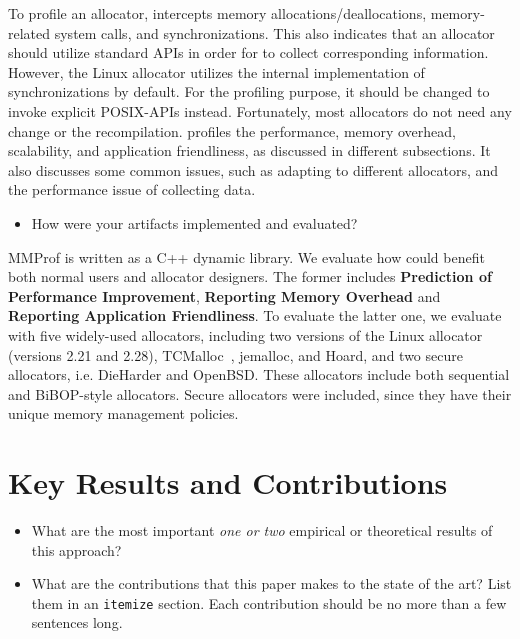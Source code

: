 \documentclass[pageno]{jpaper}
\begin{document}
\noindent
To profile an allocator, \MP{} intercepts memory allocations/deallocations, memory-related system calls, and synchronizations. This also indicates that an allocator should utilize standard APIs in order for \MP{} to collect corresponding information. However, the Linux allocator utilizes the internal implementation of synchronizations by default. For the profiling purpose, it should be changed to invoke explicit POSIX-APIs instead. Fortunately, most allocators do not need any change or the recompilation.  \MP{} profiles the performance, memory overhead, scalability, and application friendliness, as discussed in different subsections. It also discusses some common issues, such as adapting to different allocators, and the performance issue of collecting data. 

\begin{itemize}
  \item How were your artifacts implemented and evaluated? 
\end{itemize}

\noindent
MMProf is written as a C++ dynamic library. 
We evaluate how \MP{} could benefit both normal users and allocator designers. 
The former includes \textbf{Prediction of Performance Improvement}, \textbf{Reporting Memory Overhead} and \textbf{Reporting Application Friendliness}. 
To evaluate the latter one, we evaluate \MP{} with five widely-used allocators, including two versions of the Linux allocator (versions 2.21 and 2.28), TCMalloc~\cite{tcmalloc}, jemalloc, and Hoard, and two secure allocators, i.e. DieHarder and OpenBSD. These allocators include both sequential and BiBOP-style allocators. Secure allocators were included, since they have their unique memory management policies. 


\section{Key Results and Contributions}
\label{sec:key-contributions}

\begin{itemize}
  \item What are the most important \emph{one or two} empirical or theoretical
    results of this approach?
\end{itemize}

\begin{itemize}
  \item What are the contributions that this paper makes to the state of the
    art? List them in an \texttt{itemize} section. Each contribution should be no more than a few sentences long.
\end{itemize}
\end{document}
